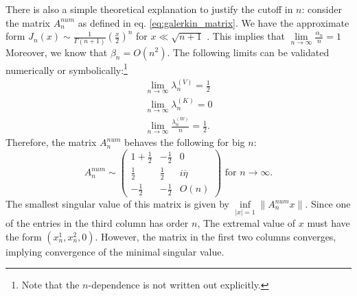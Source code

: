 \documentclass[12pt,journal,compsoc, onecolumn]{IEEEtran}
\begin{document}
\noindent
There is also a simple theoretical explanation to justify the cutoff in $n$: consider the matrix $A^{num}_n$ as defined in eq. \ref{eq:galerkin_matrix}. We have the approximate form \(J_{n}(x) \sim \frac{1}{\Gamma(n+1)}\left(\frac{x}{2}\right)^{n}\) for \(x \ll \sqrt{n+1}\) \cite{abramowitz1972abramowitz}. This implies that $\lim\limits_{n \rightarrow \infty}\frac{\alpha_n}{n} = 1$
Moreover, we know that $\beta_n = O(n^2)$. The following limits can be validated numerically or symbolically:\footnote{Note that the $n$-dependence is not written out explicitly.}
\begin{align}
    \lim\limits_{n \rightarrow \infty} \lambda_n^{(V)} = \frac{1}{2} \nonumber \\
    \lim\limits_{n \rightarrow \infty} \lambda_n^{(K)} = 0 \nonumber \\
    \lim\limits_{n \rightarrow \infty} \frac{\lambda_n^{(W)}}{n} = \frac{1}{2}. \nonumber
\end{align} Therefore, the matrix $A^{num}_n$ behaves the following for big $n$:
$$
    A^{num}_n {\sim} 
    \begin{pmatrix}
        1 + \frac{1}{2} & - \frac{1}{2} & 0 \\
        \frac{1}{2} & \frac{1}{2} & i \overline{\eta} \\
        - \frac{1}{2} & -\frac{1}{2} & O(n)
    \end{pmatrix} \text { for } n \rightarrow \infty.
$$
 The smallest singular value of this matrix is given by $\inf\limits_{|x| = 1} \|A^{num}_n x\| $. Since one of the entries in the third column has order $n$, The extremal value of $x$ must have the form $(x^1_n, x^2_n, 0)$. However, the matrix in the first two columns converges, implying convergence of the minimal singular value.
\end{document}
